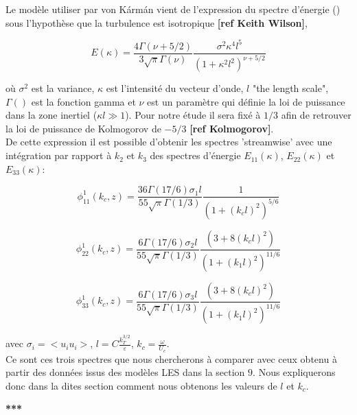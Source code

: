 \documentclass[12pt]{article}
\theoremstyle{plain}
\theoremstyle{remark}
\begin{document}
	Le modèle utiliser par von Kármán vient de l'expression du spectre d'énergie () sous l'hypothèse que la turbulence est isotropique \textbf{[\color{blue}ref Keith Wilson]},
	
	\begin{equation}
		E(\kappa) = \frac{4\Gamma(\nu + 5/2)}{3\sqrt{\pi}\Gamma(\nu)}\frac{\sigma^2\kappa^4l^5}{(1+\kappa^2l^2)^{\nu + 5/2}}
		\label{energie_spectra}
	\end{equation}

	où $\sigma^2$ est la variance, $\kappa$ est l'intensité du vecteur d'onde, $l$ "the length scale", $\Gamma()$ est la fonction gamma et $\nu$ est un paramètre qui définie la loi de puissance dans la zone inertiel ($\kappa l \gg 1$). Pour notre étude il sera fixé à $1/3$ afin de retrouver la loi de puissance de Kolmogorov de $-5/3$ \textbf{[\color{blue}ref Kolmogorov]}. \\

	De cette expression il est possible d'obtenir les spectres 'streamwise' avec une intégration par rapport à $k_2$ et $k_3$ des spectres d'énergie $E_{11}(\kappa)$, $E_{22}(\kappa)$ et $E_{33}(\kappa)$:
	
	\begin{equation}
		\phi_{11}^1(k_c,z) = \frac{36\Gamma(17/6)\sigma_1l}{55\sqrt{\pi}\Gamma(1/3)}\frac{1}{(1 + (k_cl)^2)^{5/6}}
	\end{equation}

	\begin{equation}
		\phi_{22}^1(k_c,z) = \frac{6\Gamma(17/6)\sigma_2l}{55\sqrt{\pi}\Gamma(1/3)}\frac{(3+8(k_cl)^2)}{(1 + (k_1l)^2)^{11/6}}
	\end{equation}

	\begin{equation}
		\phi_{33}^1(k_c,z) = \frac{6\Gamma(17/6)\sigma_3l}{55\sqrt{\pi}\Gamma(1/3)}\frac{(3+8(k_cl)^2)}{(1 + (k_1l)^2)^{11/6}}
	\end{equation}

	avec $\sigma_i = <u_iu_i>$, $l=C\frac{k_T^{3/2}}{\varepsilon}$, $k_c = \frac{\omega}{U_c}$.\\
	
	Ce sont ces trois spectres que nous chercherons à comparer avec ceux obtenu à partir des données issus des modèles LES dans la section $9$. Nous expliquerons donc dans la dites section comment nous obtenons les valeurs de $l$ et $k_c$.
	
	
		 
\begin{center}
	\large {\bf{***}}
\end{center}
\end{document}
